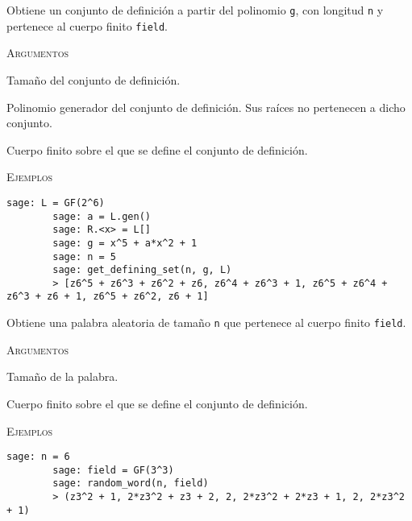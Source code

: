 \begin{description}[leftmargin=1em, font=\normalfont\ttfamily, style=nextline]
    \item[get\_defining\_set(n, pol, field)]
  
    Obtiene un conjunto de definición a partir del polinomio \texttt{g}, con longitud \texttt{n} y pertenece al cuerpo finito \texttt{field}.
  
    \textsc{Argumentos}
    \begin{description}[font=\normalfont\ttfamily]
        \item[n] Tamaño del conjunto de definición.
        \item[pol] Polinomio generador del conjunto de definición. Sus raíces no pertenecen a dicho conjunto.
        \item[field] Cuerpo finito sobre el que se define el conjunto de definición.
    \end{description}

    \textsc{Ejemplos}
    \begin{lstlisting}[gobble=4]
        sage: L = GF(2^6)
        sage: a = L.gen()
        sage: R.<x> = L[]
        sage: g = x^5 + a*x^2 + 1
        sage: n = 5
        sage: get_defining_set(n, g, L)
        > [z6^5 + z6^3 + z6^2 + z6, z6^4 + z6^3 + 1, z6^5 + z6^4 + z6^3 + z6 + 1, z6^5 + z6^2, z6 + 1]
    \end{lstlisting}

    \item[random\_word(n, field)]
  
    Obtiene una palabra aleatoria de tamaño \texttt{n} que pertenece al cuerpo finito \texttt{field}.
  
    \textsc{Argumentos}
    \begin{description}[font=\normalfont\ttfamily]
        \item[n] Tamaño de la palabra.
        \item[field] Cuerpo finito sobre el que se define el conjunto de definición.
    \end{description}

    \textsc{Ejemplos}
    \begin{lstlisting}[gobble=4]
        sage: n = 6
        sage: field = GF(3^3)
        sage: random_word(n, field)
        > (z3^2 + 1, 2*z3^2 + z3 + 2, 2, 2*z3^2 + 2*z3 + 1, 2, 2*z3^2 + 1)
    \end{lstlisting}

    \item[random\_error(n, num\_errors, field)]
  

\end{description}
